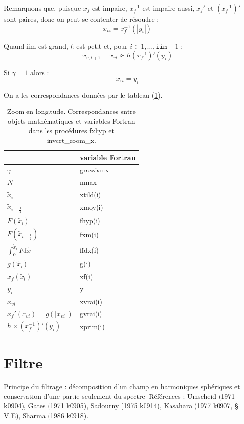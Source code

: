 \documentclass[a4paper,english,french]{article}
\newcommand{\ud}{\mathrm{d}}
\begin{document}
Remarquons que, puisque $x_f$ est impaire, $x_f^{-1}$ est impaire
aussi, $x_f'$ et $(x_f^{-1})'$ sont paires, donc on peut se contenter
de résoudre :
\begin{equation*}
  x_{vi} = x_f^{-1}(|y_i|)
\end{equation*}

Quand iim est grand, $h$ est petit et, pour $i \in {1, \dots,
  \mathtt{iim} - 1}$ :
\begin{equation*}
  x_{v, i + 1} - x_{vi} \approx  h (x_f^{-1})'(y_i)
\end{equation*}

Si $\gamma = 1$ alors :
\begin{equation*}
  x_{vi} = y_i
\end{equation*}

On a les correspondances données par le tableau (\ref{tab:zoom_x}).
\begin{table}
  \centering
  \begin{tabular}{l|l}
    & variable Fortran \\
    \hline
    $\gamma$ & grossismx \\
    $N$ & nmax \\
    $\tilde x_i$ & xtild(i) \\
    $\tilde x_{i - \frac{1}{2}}$ & xmoy(i) \\
    $F(\tilde x_i)$ & fhyp(i) \\
    $F(\tilde x_{i - \frac{1}{2}})$ & fxm(i) \\
    $\int_0 ^{\tilde x_i} F \ud \tilde x$ & ffdx(i) \\
    $g(\tilde x_i)$ & g(i) \\
    $x_f(\tilde x_i)$ & xf(i) \\
    $y_i$ & y \\
    $x_{vi}$ & xvrai(i) \\
    $x_f'(x_{vi}) = g(|x_{vi}|)$ & gvrai(i) \\
    $h \times (x_f^{-1})'(y_i)$ & xprim(i)
  \end{tabular}
  \caption{Zoom en longitude. Correspondances entre objets
    mathématiques et variables Fortran dans les procédures fxhyp et
    invert\_zoom\_x.}
  \label{tab:zoom_x}
\end{table}

\section{Filtre}

Principe du filtrage : décomposition d'un champ en harmoniques
sphériques et conservation d'une partie seulement du
spectre. Références : Umscheid (1971 k0904), Gates (1971 k0905), Sadourny
(1975 k0914), Kasahara (1977 k0907, § V.E), Sharma (1986 k0918).
\end{document}
